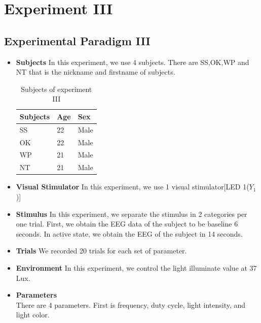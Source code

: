 \newpage
\section{Experiment III}
\subsection{Experimental Paradigm III}

\begin{itemize}
\item{\textbf{Subjects}}\newline
In this experiment, we use 4 subjects. There are SS,OK,WP and NT that is the nickname and firstname of subjects.

\begin{table}[ht]
\centering
\tabulinesep=1.5mm
\begin{tabu}{| P{.2\linewidth} | P{.2\linewidth} | P{.2\linewidth} |}
			\hline 
			\textbf{Subjects} & \textbf{Age}  & \textbf{Sex}\\
			\hline 
			SS & 22 & Male\\
			\hline 
			OK & 22 & Male\\
			\hline 
			WP & 21 & Male\\
			\hline 
			NT & 21 & Male\\
			\hline
		\end{tabu}       
\caption{Subjects of experiment III}
\label{table:2}
\end{table}

\item{\textbf{Visual Stimulator}}
In this experiment, we use 1 visual stimulator[LED 1($Y_1$)]
\item{\textbf{Stimulus}}
In this experiment, we separate the stimulus in 2 categories per one trial.
First, we obtain the EEG data of the subject to be baseline 6 seconds.
In active state, we obtain the EEG of the subject in 14 seconds.
\item{\textbf{Trials}}
We recorded 20 trials for each set of parameter.
\item{\textbf{Environment}}
In this experiment, we control the light illuminate value at 37 Lux.
\item{\textbf{Parameters}}\\
There are 4 parameters. First is frequency, duty cycle, light intensity, and light color.
\end{itemize}

